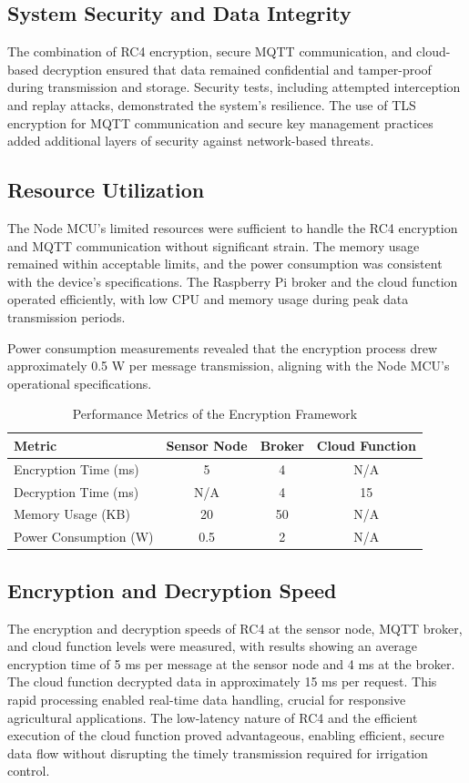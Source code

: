 \documentclass[conference]{IEEEtran}
\begin{document}
\subsection{System Security and Data Integrity}

The combination of RC4 encryption, secure MQTT communication, and cloud-based decryption ensured that data remained confidential and tamper-proof during transmission and storage. Security tests, including attempted interception and replay attacks, demonstrated the system's resilience. The use of TLS encryption for MQTT communication and secure key management practices added additional layers of security against network-based threats.

\subsection{Resource Utilization}

The Node MCU's limited resources were sufficient to handle the RC4 encryption and MQTT communication without significant strain. The memory usage remained within acceptable limits, and the power consumption was consistent with the device's specifications. The Raspberry Pi broker and the cloud function operated efficiently, with low CPU and memory usage during peak data transmission periods.

Power consumption measurements revealed that the encryption process drew approximately 0.5 W per message transmission, aligning with the Node MCU's operational specifications.

\begin{table}[ht]
\caption{Performance Metrics of the Encryption Framework}
\centering
\begin{tabular}{lccc}
\hline
\textbf{Metric} & \textbf{Sensor Node} & \textbf{Broker} & \textbf{Cloud Function} \\
\hline
Encryption Time (ms) & 5 & 4 & N/A \\
Decryption Time (ms) & N/A & 4 & 15 \\
Memory Usage (KB) & 20 & 50 & N/A \\
Power Consumption (W) & 0.5 & 2 & N/A \\
\hline
\end{tabular}
\label{table:performance_metrics}
\end{table}

\subsection{Encryption and Decryption Speed}
The encryption and decryption speeds of RC4 at the sensor node, MQTT broker, and cloud function levels were measured, with results showing an average encryption time of 5 ms per message at the sensor node and 4 ms at the broker. The cloud function decrypted data in approximately 15 ms per request. This rapid processing enabled real-time data handling, crucial for responsive agricultural applications. The low-latency nature of RC4 and the efficient execution of the cloud function proved advantageous, enabling efficient, secure data flow without disrupting the timely transmission required for irrigation control.
\end{document}
